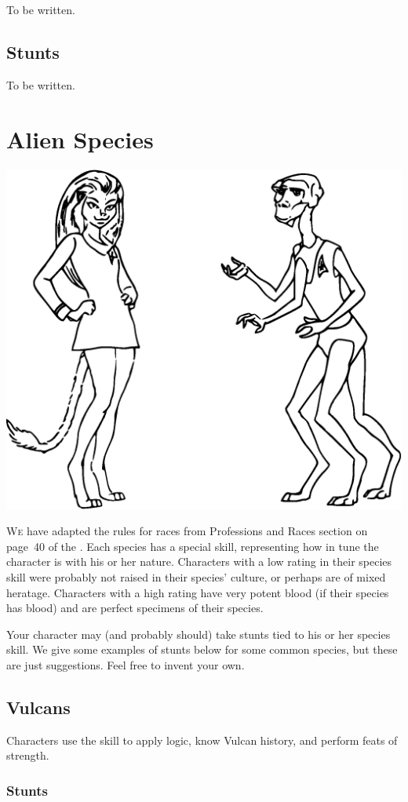 \documentclass[12pt,titlepage,openany]{book}
\begin{document}
To be written.

\section{ Stunts}\label{sec:survival-stunts}

To be written.



\chapter{Alien Species}\label{chap:species}

\begin{center}
    \includegraphics[width=0.4\linewidth]{img/AlienSpecies.eps}
\end{center}

\lettrine[lines=1]{W}{e} have adapted the rules for races from Professions and
Races section on page~40 of the \FateSystemToolkit{}. Each species has a
special skill, representing how in tune the character is with his or her
nature. Characters with a low rating in their species skill were probably not
raised in their species' culture, or perhaps are of mixed heratage. Characters
with a high rating have very potent blood (if their species has blood) and are
perfect specimens of their species.

Your character may (and probably should) take stunts tied to his or her species
skill. We give some examples of stunts below for some common species, but these
are just suggestions. Feel free to invent your own.

\section{Vulcans}\label{sec:vulcans}

Characters use the  skill to apply logic, know Vulcan history,
and perform feats of strength.

\subsection*{ Stunts}\label{subsec:vulcan-powers}
\end{document}
